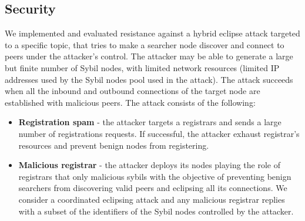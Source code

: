 \subsection{Security}


We implemented and evaluated \sysname resistance against a hybrid eclipse attack targeted to a specific topic,  that  tries to make a searcher node discover and connect to peers under the attacker's control.  
The attacker may be able to generate a large but finite number of Sybil nodes,  with limited network resources (\ie limited IP addresses used by the Sybil nodes pool used in the attack).
The attack succeeds when all the inbound and outbound connections of the target node are established with malicious peers.  The attack consists of the following:
\begin{itemize}
    \item \textbf{Registration spam} - the attacker targets a registrars and sends a large number of registrations requests. If successful, the attacker exhaust registrar's resources and prevent benign nodes from registering. 
	\item \textbf{Malicious registrar} - the attacker deploys its nodes playing the role of registrars that only malicious sybils with the objective of preventing benign searchers from discovering valid peers and eclipsing all its connections.  We consider a coordinated eclipsing attack and any malicious registrar replies with a subset of the identifiers of the Sybil nodes controlled by the attacker.
\end{itemize}

